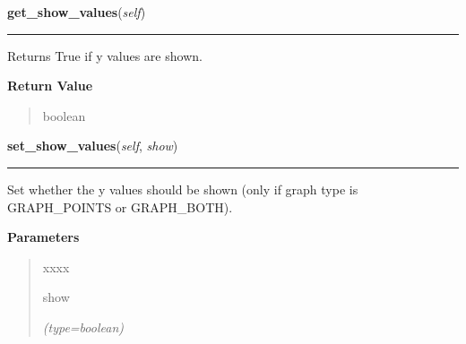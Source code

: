    \label{pygtk_chart:line_chart:Graph:get_show_values}

    \vspace{0.5ex}

\hspace{.8\funcindent}\begin{boxedminipage}{\funcwidth}

    \raggedright \textbf{get\_show\_values}(\textit{self})

    \vspace{-1.5ex}

    \rule{\textwidth}{0.5\fboxrule}
\setlength{\parskip}{2ex}
    Returns True if y values are shown.

\setlength{\parskip}{1ex}
      \textbf{Return Value}
    \vspace{-1ex}

      \begin{quote}
      boolean

      \end{quote}

    \end{boxedminipage}

    \label{pygtk_chart:line_chart:Graph:set_show_values}

    \vspace{0.5ex}

\hspace{.8\funcindent}\begin{boxedminipage}{\funcwidth}

    \raggedright \textbf{set\_show\_values}(\textit{self}, \textit{show})

    \vspace{-1.5ex}

    \rule{\textwidth}{0.5\fboxrule}
\setlength{\parskip}{2ex}
    Set whether the y values should be shown (only if graph type is 
    GRAPH\_POINTS or GRAPH\_BOTH).

\setlength{\parskip}{1ex}
      \textbf{Parameters}
      \vspace{-1ex}

      \begin{quote}
        \begin{Ventry}{xxxx}

          \item[show]

            {\it (type=boolean)}

        \end{Ventry}

      \end{quote}

    \end{boxedminipage}

